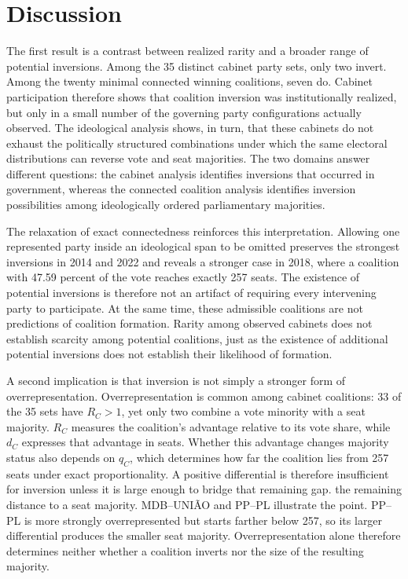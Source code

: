 \documentclass[11pt]{article}
\begin{document}
\section{Discussion}


The first result is a contrast between realized rarity and a broader range
of potential inversions. Among the 35 distinct cabinet party sets, only two
invert. Among the twenty minimal connected winning coalitions, seven do.
Cabinet participation therefore shows that coalition inversion was
institutionally realized, but only in a small number of the governing party
configurations actually observed. The ideological analysis shows, in turn,
that these cabinets do not exhaust the politically structured combinations
under which the same electoral distributions can reverse vote and seat
majorities. The two domains answer different questions: the cabinet analysis
identifies inversions that occurred in government, whereas the connected
coalition analysis identifies inversion possibilities among ideologically
ordered parliamentary majorities.

The relaxation of exact connectedness reinforces this interpretation. Allowing
one represented party inside an ideological span to be omitted preserves the
strongest inversions in 2014 and 2022 and reveals a stronger case in 2018, where
a coalition with 47.59 percent of the vote reaches exactly 257 seats. The
existence of potential inversions is therefore not an artifact of requiring
every intervening party to participate. At the same time, these admissible
coalitions are not predictions of coalition formation. Rarity among observed
cabinets does not establish scarcity among potential coalitions, just as the
existence of additional potential inversions does not establish their likelihood
of formation.


A second implication is that inversion is not simply a stronger form of
overrepresentation. Overrepresentation is common among cabinet coalitions: 33 of
the 35 sets have \(R_C>1\), yet only two combine a vote minority with a seat
majority. \(R_C\) measures the coalition's advantage relative to its vote share,
while \(d_C\) expresses that advantage in seats. Whether this advantage changes
majority status also depends on \(q_C\), which determines how far the coalition
lies from 257 seats under exact proportionality. A positive differential is
therefore insufficient for inversion unless it is large enough to bridge that
remaining gap. the remaining distance to a seat majority. MDB--UNI\~AO and
PP--PL illustrate the point. PP--PL is more strongly overrepresented but starts
farther below 257, so its larger differential produces the smaller seat
majority. Overrepresentation alone therefore determines neither whether a
coalition inverts nor the size of the resulting majority.
\end{document}
